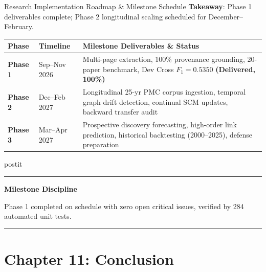 \documentclass[aspectratio=43,10pt]{beamer}
\newcommand{\card}[4][\linewidth]{%
  \begin{beamercolorbox}[wd=#1,sep=0pt,rounded=false,shadow=false]{postit}%
    {\color{#3}\rule{\linewidth}{1.5pt}}\par
    \colorbox{slatebg}{%
      \begin{minipage}{\dimexpr#1-8pt\relax}%
        \vspace{1.5pt}%
        {\footnotesize\bfseries\color{#3}#2}\vspace{1.5pt}\par%
        {\scriptsize\color{darktext}#4}%
        \vspace{1.5pt}%
      \end{minipage}%
    }%
    \par{\color{bordergray}\rule{\linewidth}{0.6pt}}%
  \end{beamercolorbox}%
}
\begin{document}
\begin{frame}{Research Implementation Roadmap \& Milestone Schedule}
  \textbf{Takeaway}: Phase 1 deliverables complete; Phase 2 longitudinal scaling scheduled for December--February.
  \vspace{0.12cm}
  \begin{center}
    \scriptsize
    \renewcommand{\arraystretch}{1.15}
    \begin{tabularx}{\linewidth}{p{1.3cm}p{1.5cm}X}
      \toprule
      \textbf{\color{navy}Phase} & \textbf{\color{navy}Timeline} & \textbf{\color{navy}Milestone Deliverables \& Status} \\
      \midrule
      \textbf{Phase 1} & Sep--Nov 2026 & Multi-page extraction, 100\% provenance grounding, 20-paper benchmark, Dev Cross $F_1 = 0.5350$ {\color{green}\textbf{(Delivered, 100\%)}} \\
      \addlinespace[2pt]
      \textbf{Phase 2} & Dec--Feb 2027 & Longitudinal 25-yr PMC corpus ingestion, temporal graph drift detection, continual SCM updates, backward transfer audit \\
      \addlinespace[2pt]
      \textbf{Phase 3} & Mar--Apr 2027 & Prospective discovery forecasting, high-order link prediction, historical backtesting (2000--2025), defense preparation \\
      \bottomrule
    \end{tabularx}
  \end{center}
  \vspace{0.12cm}
  \card{Milestone Discipline}{navy}{
    Phase 1 completed on schedule with zero open critical issues, verified by 284 automated unit tests.
  }
\end{frame}

\section{Chapter 11: Conclusion}
\end{document}
